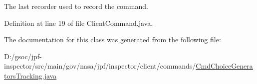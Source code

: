 The last recorder used to record the command. 



Definition at line 19 of file Client\+Command.\+java.



The documentation for this class was generated from the following file\+:\begin{DoxyCompactItemize}
\item 
D\+:/gsoc/jpf-\/inspector/src/main/gov/nasa/jpf/inspector/client/commands/\hyperlink{_cmd_choice_generators_tracking_8java}{Cmd\+Choice\+Generators\+Tracking.\+java}\end{DoxyCompactItemize}

